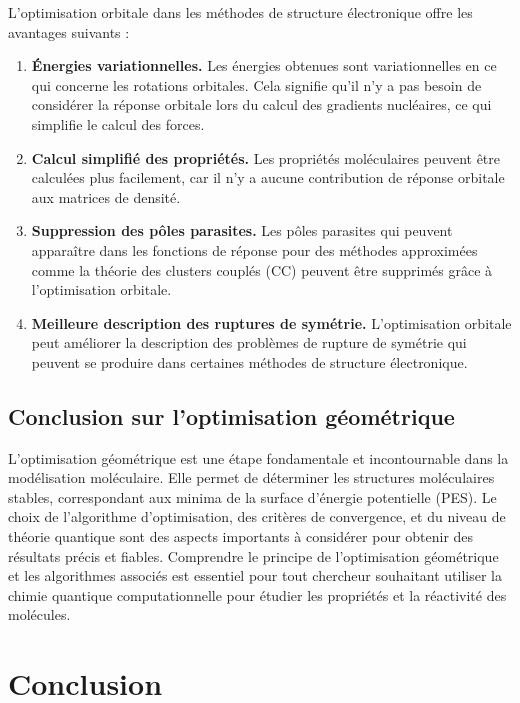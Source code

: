 \documentclass[12pt,a4paper]{article} %
\numberwithin{equation}{section} %
\numberwithin{figure}{section} %
\numberwithin{table}{section} %
\begin{document}
L'optimisation orbitale dans les méthodes de structure électronique offre les avantages suivants :
\begin{enumerate}
 \item \textbf{Énergies variationnelles.} Les énergies obtenues sont variationnelles en ce qui concerne les rotations orbitales. Cela signifie qu'il n'y a pas besoin de considérer la réponse orbitale lors du calcul des gradients nucléaires, ce qui simplifie le calcul des forces.

 \item \textbf{Calcul simplifié des propriétés.} Les propriétés moléculaires peuvent être calculées plus facilement, car il n'y a aucune contribution de réponse orbitale aux matrices de densité.

 \item \textbf{Suppression des pôles parasites.} Les pôles parasites qui peuvent apparaître dans les fonctions de réponse pour des méthodes approximées comme la théorie des clusters couplés (CC) peuvent être supprimés grâce à l'optimisation orbitale.

 \item \textbf{Meilleure description des ruptures de symétrie.} L'optimisation orbitale peut améliorer la description des problèmes de rupture de symétrie qui peuvent se produire dans certaines méthodes de structure électronique.
\end{enumerate}

\subsection{Conclusion sur l'optimisation géométrique}

L'optimisation géométrique est une étape fondamentale et incontournable dans la modélisation moléculaire. Elle permet de déterminer les structures moléculaires stables, correspondant aux minima de la surface d'énergie potentielle (PES). Le choix de l'algorithme d'optimisation, des critères de convergence, et du niveau de théorie quantique sont des aspects importants à considérer pour obtenir des résultats précis et fiables. Comprendre le principe de l'optimisation géométrique et les algorithmes associés est essentiel pour tout chercheur souhaitant utiliser la chimie quantique computationnelle pour étudier les propriétés et la réactivité des molécules.

\section{Conclusion}
\end{document}
